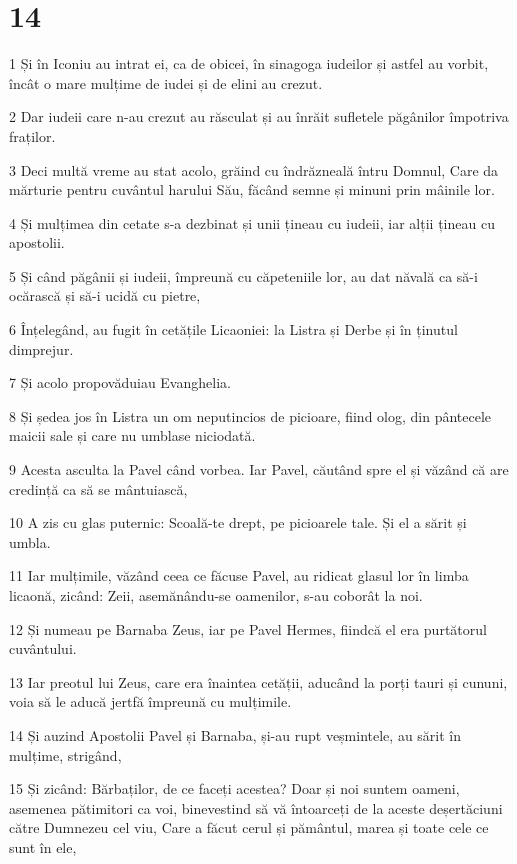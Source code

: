 \chapter{14}

\par 1 Și în Iconiu au intrat ei, ca de obicei, în sinagoga iudeilor și astfel au vorbit, încât o mare mulțime de iudei și de elini au crezut.
\par 2 Dar iudeii care n-au crezut au răsculat și au înrăit sufletele păgânilor împotriva fraților.
\par 3 Deci multă vreme au stat acolo, grăind cu îndrăzneală întru Domnul, Care da mărturie pentru cuvântul harului Său, făcând semne și minuni prin mâinile lor.
\par 4 Și mulțimea din cetate s-a dezbinat și unii țineau cu iudeii, iar alții țineau cu apostolii.
\par 5 Și când păgânii și iudeii, împreună cu căpeteniile lor, au dat năvală ca să-i ocărască și să-i ucidă cu pietre,
\par 6 Înțelegând, au fugit în cetățile Licaoniei: la Listra și Derbe și în ținutul dimprejur.
\par 7 Și acolo propovăduiau Evanghelia.
\par 8 Și ședea jos în Listra un om neputincios de picioare, fiind olog, din pântecele maicii sale și care nu umblase niciodată.
\par 9 Acesta asculta la Pavel când vorbea. Iar Pavel, căutând spre el și văzând că are credință ca să se mântuiască,
\par 10 A zis cu glas puternic: Scoală-te drept, pe picioarele tale. Și el a sărit și umbla.
\par 11 Iar mulțimile, văzând ceea ce făcuse Pavel, au ridicat glasul lor în limba licaonă, zicând: Zeii, asemănându-se oamenilor, s-au coborât la noi.
\par 12 Și numeau pe Barnaba Zeus, iar pe Pavel Hermes, fiindcă el era purtătorul cuvântului.
\par 13 Iar preotul lui Zeus, care era înaintea cetății, aducând la porți tauri și cununi, voia să le aducă jertfă împreună cu mulțimile.
\par 14 Și auzind Apostolii Pavel și Barnaba, și-au rupt veșmintele, au sărit în mulțime, strigând,
\par 15 Și zicând: Bărbaților, de ce faceți acestea? Doar și noi suntem oameni, asemenea pătimitori ca voi, binevestind să vă întoarceți de la aceste deșertăciuni către Dumnezeu cel viu, Care a făcut cerul și pământul, marea și toate cele ce sunt în ele,
